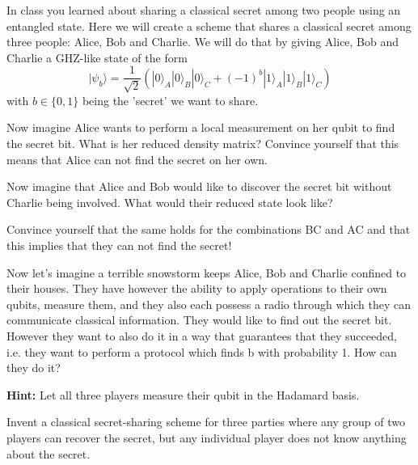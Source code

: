 \documentclass[a4paper,10pt,landscape,twocolumn]{scrartcl}
\newcommand{\ket}[1]{| #1 \rangle}
\begin{document}
\begin{exercise}

In class you learned about sharing a classical secret among two people using an entangled state. Here we will create a scheme that shares a classical secret among three people: Alice, Bob and Charlie. We will do that by giving Alice, Bob and Charlie a GHZ-like state of the form
\[ \ket{\psi_b} = \frac{1}{\sqrt{2}} (\ket{0}_A\ket{0}_B \ket{0}_C + (-1)^b \ket{1}_A\ket{1}_B \ket{1}_C)\]
with $b \in \{0,1\}$ being the 'secret' we want to share. 

\begin{subex}
Now imagine Alice wants to perform a local measurement on her qubit to find the secret bit. What is her reduced density matrix? Convince yourself that this means that Alice can not find the secret on her own.
\end{subex}

\begin{subex}
Now imagine that Alice and Bob would like to discover the secret bit without Charlie being involved. What would their reduced state look like?

Convince yourself that the same holds for the combinations BC and AC and that this implies that they can not find the secret!
\end{subex}

\begin{subex}
Now let's imagine a terrible snowstorm keeps Alice, Bob and Charlie confined to their houses. They have however the ability to apply operations to their own qubits, measure them, and they also each possess a radio through which they can communicate classical information. They would like to find out the secret bit. However they want to also do it in a way that guarantees that they succeeded, i.e. they want to perform a protocol which finds b with probability 1. How can they do it?

\textbf{Hint:} Let all three players measure their qubit in the Hadamard basis.
\end{subex}

\begin{subex}
Invent a classical secret-sharing scheme for three parties where any group of two players can recover the secret, but any individual player does not know anything about the secret.
\end{subex}

\end{exercise}
\end{document}
